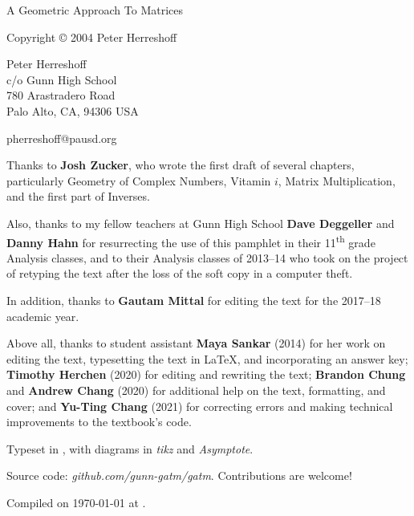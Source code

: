 \documentclass[../textbook.tex]{subfiles}
\begin{document}
\newcommand\dnew{\vspace{1cm}}

\begin{center}
	\vspace*{\fill}

	\doublespacing
	A Geometric Approach To Matrices

    Copyright \copyright{} 2004 Peter Herreshoff  %

	\vspace{1cm}

	Peter Herreshoff\\
	c/o Gunn High School\\
	780 Arastradero Road\\
	Palo Alto, CA, 94306 USA

	\vspace{.5cm}

    pherreshoff@pausd.org %

	\vspace{1cm}
\end{center}

\noindent Thanks to \textbf{Josh Zucker}, who wrote the first draft of several chapters, particularly Geometry of Complex Numbers, Vitamin $i$, Matrix Multiplication, and the first part of Inverses.

\noindent Also, thanks to my fellow teachers at Gunn High School \textbf{Dave Deggeller} and \textbf{Danny Hahn} for resurrecting the use of this pamphlet in their 11\textsuperscript{th} grade Analysis classes, and to their Analysis classes of 2013--14 who took on the project of retyping the text after the loss of the soft copy in a computer theft.

\noindent In addition, thanks to \textbf{Gautam Mittal} for editing the text for the 2017--18 academic year.

\noindent Above all, thanks to student assistant \textbf{Maya Sankar} (2014) for her work on editing the text, typesetting the text in \LaTeX{}, and incorporating an answer key; \textbf{Timothy Herchen} (2020) for editing and rewriting the text; \textbf{Brandon Chung} and \textbf{Andrew Chang} (2020) for additional help on the text, formatting, and cover; and \textbf{Yu-Ting Chang} (2021) for correcting errors and making technical improvements to the textbook's code.

\vspace{0.5cm}

\noindent Typeset in \LaTeXe, with diagrams in \textit{tikz} and \textit{Asymptote}.

\noindent Source code: \textit{github.com/gunn-gatm/gatm}. Contributions are welcome!

\noindent Compiled on {\ddmmyyyydate\today} at \currenttime.

\vspace*{\fill}
\end{document}

